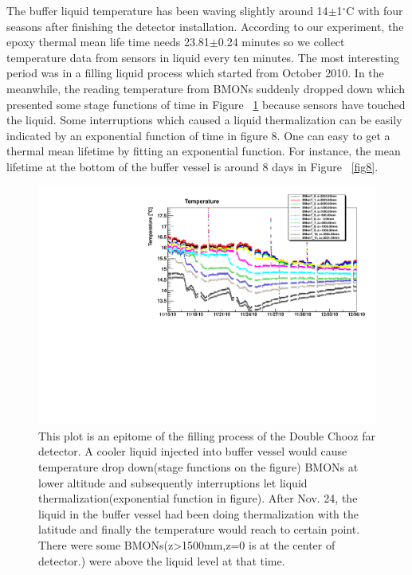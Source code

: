 \documentclass{JINST}
\begin{document}
The buffer liquid temperature has been waving slightly around 14$\pm$1$^\circ$C with four seasons after finishing the detector installation. According to our experiment, the epoxy thermal mean life time needs 23.81$\pm$0.24 minutes so we collect temperature data from sensors in liquid every ten minutes. The most interesting period was in a filling liquid process which started from October 2010. In the meanwhile, the reading temperature from BMONs suddenly dropped down which presented some stage functions of time in Figure ~\ref{fig7} because sensors have touched the liquid. Some interruptions which caused a liquid thermalization can be easily indicated by an exponential function of time in figure 8. One can easy to get a thermal mean lifetime by fitting an exponential function. For instance, the mean lifetime at the bottom of the buffer vessel is around 8 days in Figure ~\ref{fig8}.
\begin{figure}
\centering
\includegraphics[width=.6\textwidth]{BMonall_Temperature2010-11-15to2010-12-6.pdf}
\caption{This plot is an epitome of the filling process of the Double Chooz far detector. A cooler liquid injected into buffer vessel would cause temperature drop down(stage functions on the figure) BMONs at lower altitude and subsequently interruptions let liquid thermalization(exponential function in figure). After Nov. 24, the liquid in the buffer vessel had been doing thermalization with the latitude and finally the temperature would reach to certain point. There were some BMONs(z>1500mm,z=0 is at the center of detector.) were above the liquid level at that time.}
\label{fig7}
\end{figure}
\end{document}
